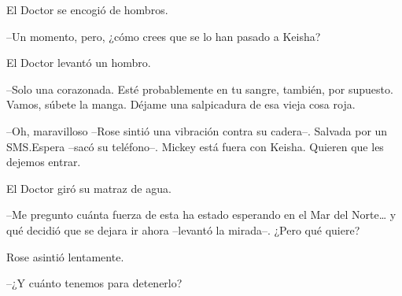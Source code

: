 {El Doctor se encogió de hombros.}

{--Un momento, pero, ¿cómo crees que se lo han pasado a Keisha?}

{El Doctor levantó un hombro.}

{--Solo una corazonada. Esté probablemente en tu sangre, también, por
 supuesto. Vamos, súbete la manga. Déjame una salpicadura de esa vieja
cosa roja.}

{--Oh, maravilloso --Rose sintió una vibración contra su cadera--.
 Salvada por un SMS.\@ Espera --sacó su teléfono--. Mickey está fuera con
Keisha. Quieren que les dejemos entrar.}

{El Doctor giró su matraz de agua.}

{--Me pregunto cuánta fuerza de esta ha estado esperando en el Mar del
 Norte\ldots{} y qué decidió que se dejara ir ahora --levantó la
mirada--. ¿Pero qué quiere?}

{Rose asintió lentamente.}

{--¿Y cuánto tenemos para detenerlo?}
